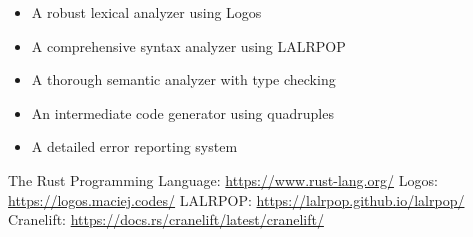 \documentclass[12pt,a4paper]{article}
\begin{document}
\begin{itemize}
	\item A robust lexical analyzer using Logos
	\item A comprehensive syntax analyzer using LALRPOP
	\item A thorough semantic analyzer with type checking
	\item An intermediate code generator using quadruples
	\item A detailed error reporting system
\end{itemize}

\begin{thebibliography}{9}
	 The Rust Programming Language: \url{https://www.rust-lang.org/}
	 Logos: \url{https://logos.maciej.codes/}
	 LALRPOP: \url{https://lalrpop.github.io/lalrpop/}
	 Cranelift: \url{https://docs.rs/cranelift/latest/cranelift/}
\end{thebibliography}
\end{document}
